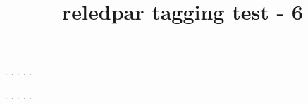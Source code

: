 \documentclass[a5paper,11pt]{article}
\title{reledpar tagging test - 6}
\begin{document}
\begin{pages}
    \begin{Leftside}
        \beginnumbering
            . \blindtext[21]
            \pend{}. \blindtext[10]
            \pend{}. \blindtext[6]
            \pend{}. \blindtext[6]
            \pend
            . \blindtext[6]
            \pend
        \endnumbering
    \end{Leftside}
    \begin{Rightside}
        \beginnumbering
            . \blindtext[22]\footnoteAmk
            \pend{}. \blindtext[12]
            \pend{}. \blindtext[12]
            \pend
            . \blindtext[12]
            \pend
            . \blindtext[12]
            \pend
        \endnumbering
    \end{Rightside}
\end{pages}
\Pages
\end{document}
